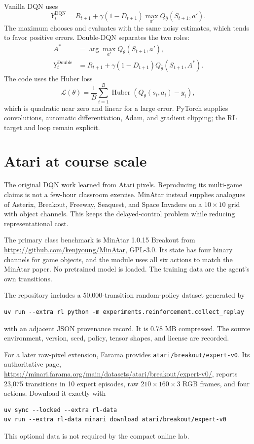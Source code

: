 \documentclass[11pt]{article}
\begin{document}
Vanilla DQN uses
\begin{equation}
Y_t^{\mathrm{DQN}}=R_{t+1}+\gamma(1-D_{t+1})
\max_{a'}Q_{\bar\theta}(S_{t+1},a').
\end{equation}
The maximum chooses and evaluates with the same noisy estimates, which tends to
favor positive errors. Double-DQN separates the two roles:
\begin{align}
A^*&=\arg\max_{a'}Q_\theta(S_{t+1},a'),\\
Y_t^{\mathrm{Double}}&=R_{t+1}+\gamma(1-D_{t+1})
Q_{\bar\theta}(S_{t+1},A^*).
\end{align}
The code uses the Huber loss
\begin{equation}
\mathcal L(\theta)=\frac1B\sum_{i=1}^B
\operatorname{Huber}\left(Q_\theta(s_i,a_i)-y_i\right),
\end{equation}
which is quadratic near zero and linear for a large error. PyTorch supplies
convolutions, automatic differentiation, Adam, and gradient clipping; the RL
target and loop remain explicit.

\section{Atari at course scale}

The original DQN work learned from Atari pixels. Reproducing its multi-game
claims is not a few-hour classroom exercise. MinAtar instead supplies analogues
of Asterix, Breakout, Freeway, Seaquest, and Space Invaders on a $10\times10$
grid with object channels. This keeps the delayed-control problem while reducing
representational cost.

The primary class benchmark is MinAtar 1.0.15 Breakout from
\url{https://github.com/kenjyoung/MinAtar}, GPL-3.0. Its state has four binary
channels for game objects, and the module uses all six actions to match the
MinAtar paper. No pretrained model is loaded. The training data are the agent's
own transitions.

The repository includes a 50,000-transition random-policy dataset generated by
\begin{verbatim}
uv run --extra rl python -m experiments.reinforcement.collect_replay
\end{verbatim}
with an adjacent JSON provenance record. It is 0.78 MB compressed. The source
environment, version, seed, policy, tensor shapes, and license are recorded.

For a later raw-pixel extension, Farama provides
\texttt{atari/breakout/expert-v0}. Its authoritative page,
\url{https://minari.farama.org/main/datasets/atari/breakout/expert-v0/}, reports
23,075 transitions in 10 expert episodes, raw $210\times160\times3$ RGB frames,
and four actions. Download it exactly with
\begin{verbatim}
uv sync --locked --extra rl-data
uv run --extra rl-data minari download atari/breakout/expert-v0
\end{verbatim}
This optional data is not required by the compact online lab.
\end{document}
